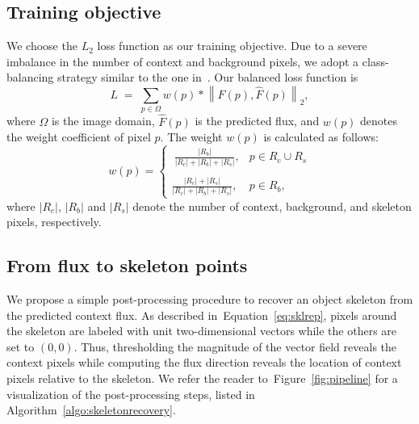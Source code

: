 \documentclass[10pt,twocolumn,letterpaper]{article}
\newcommand{\reffig}[1]{Figure~\ref{#1}}
\newcommand{\refeq}[1]{Equation~\eqref{#1}}
\begin{document}
\subsection{Training objective} \label{sec:trainingobjective}
We choose the $L_2$ loss function as our training objective.
Due to a severe imbalance in the number of context and background pixels, we adopt a class-balancing strategy similar to the one in~\cite{xie2015hed}.
Our balanced loss function is
\begin{equation}
L \; = \; \sum_{p \in \Omega}{w(p) * \left\|F(p), \hat{F}(p)\right\|_2},
\label{eq:loss}
\end{equation}
where $\Omega$ is the image domain, $\hat{F}(p)$ is the predicted flux, and $w(p)$ denotes the weight coefficient of pixel $p$.
The weight $w(p)$ is calculated as follows:
\begin{equation}
w(p) =
\left\{
\begin{matrix} \
\frac{|R_b|}{|R_c|+|R_b|+|R_s|}, & p \in R_c \cup R_s \\ \\
\frac{|R_c|+|R_s|}{|R_c|+|R_b|+|R_s|}, & p \in R_b,
\end{matrix}
\right.
\label{eq:weight}
\end{equation}
where $|R_c|$, $|R_b|$ and $|R_s|$ denote the number of context, background, and skeleton pixels, respectively.

\subsection{From flux to skeleton points} \label{sec:postprocessing}
We propose a simple post-processing procedure to recover an object skeleton from the predicted context flux.
As described in~\refeq{eq:sklrep}, pixels around the skeleton are labeled with unit two-dimensional vectors while the others are set to $(0, 0)$.
Thus, thresholding the magnitude of the vector field reveals the context pixels while
computing the flux direction reveals the location of context pixels relative to the skeleton. We refer the reader to~\reffig{fig:pipeline} for a visualization of the post-processing steps, listed in Algorithm~\ref{algo:skeletonrecovery}.
\end{document}
